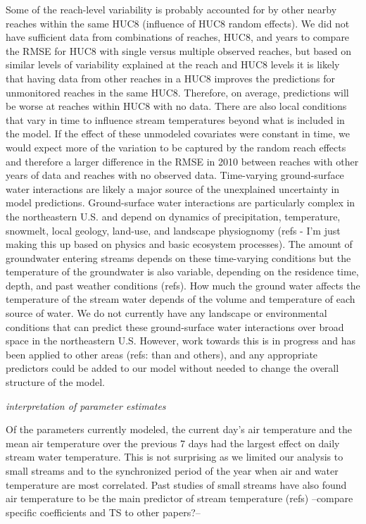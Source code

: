 \documentclass[]{article}
\begin{document}
Some of the reach-level variability is probably accounted for by other
nearby reaches within the same HUC8 (influence of HUC8 random effects).
We did not have sufficient data from combinations of reaches, HUC8, and
years to compare the RMSE for HUC8 with single versus multiple observed
reaches, but based on similar levels of variability explained at the
reach and HUC8 levels it is likely that having data from other reaches
in a HUC8 improves the predictions for unmonitored reaches in the same
HUC8. Therefore, on average, predictions will be worse at reaches within
HUC8 with no data. There are also local conditions that vary in time to
influence stream temperatures beyond what is included in the model. If
the effect of these unmodeled covariates were constant in time, we would
expect more of the variation to be captured by the random reach effects
and therefore a larger difference in the RMSE in 2010 between reaches
with other years of data and reaches with no observed data. Time-varying
ground-surface water interactions are likely a major source of the
unexplained uncertainty in model predictions. Ground-surface water
interactions are particularly complex in the northeastern U.S. and
depend on dynamics of precipitation, temperature, snowmelt, local
geology, land-use, and landscape physiognomy (refs - I'm just making
this up based on physics and basic ecosystem processes). The amount of
groundwater entering streams depends on these time-varying conditions
but the temperature of the groundwater is also variable, depending on
the residence time, depth, and past weather conditions (refs). How much
the ground water affects the temperature of the stream water depends of
the volume and temperature of each source of water. We do not currently
have any landscape or environmental conditions that can predict these
ground-surface water interactions over broad space in the northeastern
U.S. However, work towards this is in progress and has been applied to
other areas (refs: than and others), and any appropriate predictors
could be added to our model without needed to change the overall
structure of the model.

\emph{interpretation of parameter estimates}

Of the parameters currently modeled, the current day's air temperature
and the mean air temperature over the previous 7 days had the largest
effect on daily stream water temperature. This is not surprising as we
limited our analysis to small streams and to the synchronized period of
the year when air and water temperature are most correlated. Past
studies of small streams have also found air temperature to be the main
predictor of stream temperature (refs) --compare specific coefficients
and TS to other papers?--
\end{document}
